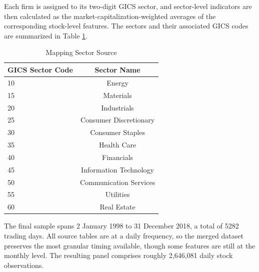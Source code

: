 Each firm is assigned to its two-digit GICS sector, and sector-level indicators are then calculated as the market-capitalization-weighted averages of the corresponding stock-level features.  The sectors and their associated GICS codes are summarized in Table \ref{tab:sectors_mapp}.  

\begin{table}[htbp]
     \centering
     \caption{Mapping Sector Source}
     \label{tab:sectors_mapp}
     \begin{threeparttable}             %
         \begin{tabular}{@{}l c@{}}
             \toprule
             \textbf{GICS Sector Code} & \textbf{Sector Name}\\
             \midrule
             10 & Energy\\
             15 & Materials\\
             20 & Industrials\\
             25 & Consumer Discretionary\\
             30 & Consumer Staples\\
             35 & Health Care\\
             40 & Financials\\
             45 & Information Technology\\
             50 & Communication Services\\
             55 & Utilities\\
             60 & Real Estate\\
             \bottomrule
         \end{tabular}
 
     \end{threeparttable}               %
 \end{table}

The final sample spans 2 January 1998 to 31 December 2018, a total of 5282 trading days. All source tables are at a daily frequency, so the merged dataset preserves the most granular timing available, though some features are still at the monthly level. The resulting panel comprises roughly 2,646,081 daily stock observations. 

